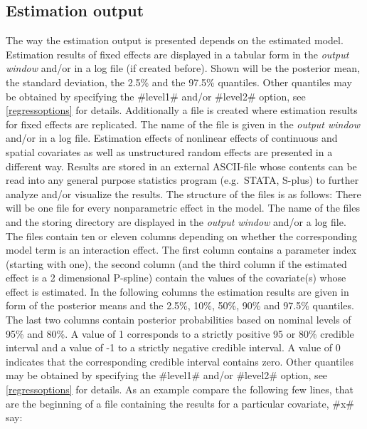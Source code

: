 \subsection{Estimation output}

The way the estimation output is presented depends on the
estimated model. Estimation results of fixed effects are displayed
in a tabular form in the {\em output window} and/or in a log file
(if created before). Shown will be the posterior mean, the
standard deviation, the 2.5\% and the 97.5\% quantiles. Other
quantiles may be obtained by specifying the #level1# and/or
#level2# option, see \autoref{regressoptions} for details.
Additionally a file is created where estimation results for fixed
effects are replicated. The name of the file is given in the {\em
output window} and/or in a log file. Estimation effects of
nonlinear effects of continuous and spatial covariates as well as
unstructured random effects are presented in a different way.
Results are stored in an external ASCII-file whose contents can be
read into any general purpose statistics program (e.g.~STATA,
S-plus) to further analyze and/or visualize the results. The
structure of the files is as follows: There will be one file for
every nonparametric effect in the model. The name of the files and
the storing directory are displayed in the {\em output window}
and/or a log file. The files contain ten or eleven columns
depending on whether the corresponding model term is an
interaction effect. The first column contains a parameter index
(starting with one), the second column (and the third column if
the estimated effect is a 2 dimensional P-spline) contain the
values of the covariate(s) whose effect is estimated. In the
following columns the estimation results are given in form of the
posterior means and the 2.5\%, 10\%, 50\%, 90\% and 97.5\%
quantiles. The last two columns contain posterior probabilities
based on nominal levels of 95\% and 80\%. A value of 1 corresponds
to a strictly positive 95 or 80\% credible interval and a value of
-1 to a strictly negative credible interval. A value of 0
indicates that the corresponding credible interval contains zero.
Other quantiles may be obtained by specifying the #level1# and/or
#level2# option, see \autoref{regressoptions} for details. As an
example compare the following few lines, that are the beginning of
a file containing the results for a particular covariate, #x# say:


